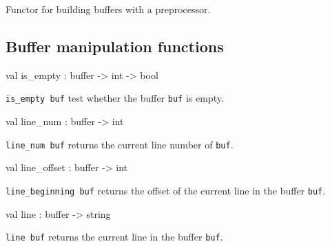\documentclass[11pt]{article}
\begin{document}
\begin{ocamldocdescription}
Functor for building buffers with a preprocessor.


\end{ocamldocdescription}




\subsection{Buffer manipulation functions}




\label{val:Input.is-underscoreempty}\begin{ocamldoccode}
val is_empty : buffer -> int -> bool
\end{ocamldoccode}
\begin{ocamldocdescription}
{\tt{is\_empty buf}} test whether the buffer {\tt{buf}} is empty.


\end{ocamldocdescription}




\label{val:Input.line-underscorenum}\begin{ocamldoccode}
val line_num : buffer -> int
\end{ocamldoccode}
\begin{ocamldocdescription}
{\tt{line\_num buf}} returns the current line number of {\tt{buf}}.


\end{ocamldocdescription}




\label{val:Input.line-underscoreoffset}\begin{ocamldoccode}
val line_offset : buffer -> int
\end{ocamldoccode}
\begin{ocamldocdescription}
{\tt{line\_beginning buf}} returns the offset of the current line  in  the
    buffer {\tt{buf}}.


\end{ocamldocdescription}




\label{val:Input.line}\begin{ocamldoccode}
val line : buffer -> string
\end{ocamldoccode}
\begin{ocamldocdescription}
{\tt{line buf}} returns the current line in the buffer {\tt{buf}}.


\end{ocamldocdescription}
\end{document}
